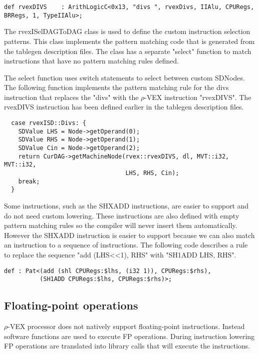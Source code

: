 \begin{lstlisting}
def rvexDIVS    : ArithLogicC<0x13, "divs ", rvexDivs, IIAlu, CPURegs, BRRegs, 1, TypeIIAlu>;
\end{lstlisting}

The rvexISelDAGToDAG class is used to define the custom instruction selection patterns. This class implements the pattern matching code that is generated from the tablegen description files. The class has a separate "select" function to match instructions that have no pattern matching rules defined.

The select function uses switch statements to select between custom SDNodes. The following function implements the pattern matching rule for the divs instruction that replaces the "divs" with the $\rho$-VEX instruction "rvexDIVS". The rvexDIVS instruction has been defined earlier in the tablegen description files.

\begin{lstlisting}   
  case rvexISD::Divs: {
    SDValue LHS = Node->getOperand(0);
    SDValue RHS = Node->getOperand(1);
    SDValue Cin = Node->getOperand(2);
    return CurDAG->getMachineNode(rvex::rvexDIVS, dl, MVT::i32, MVT::i32,
                                  LHS, RHS, Cin);
    break;
  }
\end{lstlisting}

Some instructions, such as the SHXADD instructions, are easier to support and do not need custom lowering. These instructions are also defined with empty pattern matching rules so the compiler will never insert them automatically. However the SHXADD instruction is easier to support because we can also match an instruction to a sequence of instructions. The following code describes a rule to replace the sequence "add (LHS\textless\textless1), RHS" with "SH1ADD LHS, RHS".

\begin{lstlisting}
def : Pat<(add (shl CPURegs:$lhs, (i32 1)), CPURegs:$rhs),
          (SH1ADD CPURegs:$lhs, CPURegs:$rhs)>;
\end{lstlisting}

\subsection{Floating-point operations}
$\rho$-VEX processor does not natively support floating-point instructions. Instead software functions are used to execute FP operations. During instruction lowering FP operations are translated into library calls that will execute the instructions.

